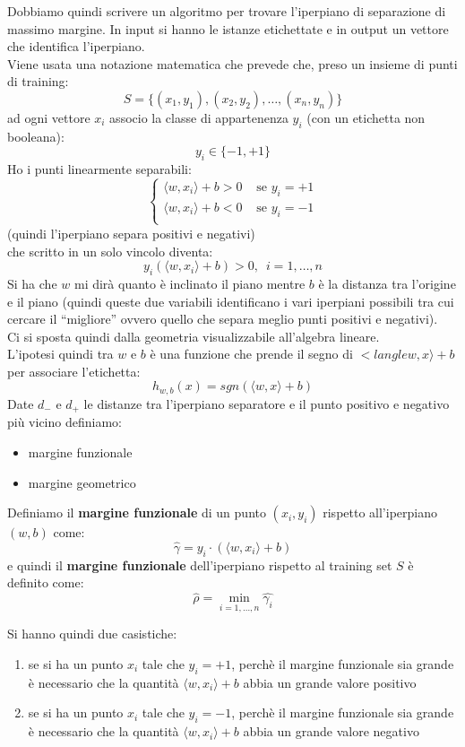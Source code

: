 \documentclass[a4paper,12pt, oneside]{book}
\begin{document}
Dobbiamo quindi scrivere un algoritmo per trovare l'iperpiano di separazione di
massimo margine. In input si hanno le istanze etichettate e in output un
vettore che identifica l'iperpiano.\\
Viene usata una notazione matematica che prevede che, preso un insieme di punti
di training:
\[S = \{(x_1,y_1), (x_2,y_2),\ldots, (x_n,y_n)\}\]
ad ogni vettore $x_i$ associo la classe di appartenenza $y_i$ (con un etichetta
non booleana):
\[y_i\in\{-1,+1\}\]
Ho i punti linearmente separabili:
\[
  \begin{cases}
    \langle w,x_i\rangle + b >0 &\mbox{ se }y_i=+1\\
    \langle w,x_i\rangle + b <0 &\mbox{ se }y_i=-1\\
  \end{cases}
\](quindi l'iperpiano separa positivi e negativi)\\
che scritto in un solo vincolo diventa:
\[y_i(\langle w,x_i\rangle + b )>0,\,\,\,i=1,\ldots, n\]
Si ha che $w$ mi dirà quanto è inclinato il piano mentre $b$ è la distanza tra
l'origine e il piano (quindi queste due variabili identificano i vari iperpiani
possibili tra cui cercare il ``migliore'' ovvero quello che separa meglio punti
positivi e negativi).\\
Ci si sposta quindi dalla geometria visualizzabile all'algebra lineare.\\
L'ipotesi quindi tra $w$ e $b$ è una funzione che prende il segno di $<langle
w,x\rangle+b$ per associare l'etichetta:
\[h_{w,b}(x)=sgn(\langle w,x\rangle+b)\]
Date $d_-$ e $d_+$ le distanze tra l’iperpiano separatore e il punto positivo e
negativo più vicino definiamo:
\begin{itemize}
  \item margine funzionale
  \item margine geometrico
\end{itemize}
\begin{definizione}
  Definiamo il \textbf{margine funzionale} di un punto $(x_i,y_i)$ rispetto
  all'iperpiano $(w,b)$ come:
  \[\hat{\gamma}=y_i\cdot(\langle w,x_i\rangle+b)\]
  e quindi il \textbf{margine funzionale} dell'iperpiano rispetto al training
  set $S$ è definito come:
  \[\hat{\rho}=\min_{i=1,\ldots,n}\hat{\gamma_i}\]
\end{definizione}
Si hanno quindi due casistiche:
\begin{enumerate}
  \item se si ha un punto $x_i$ tale che $y_i=+1$, perchè il margine funzionale
  sia grande è necessario che la quantità
  $\langle w,x_i\rangle+b$ abbia un grande valore positivo
   \item se si ha un punto $x_i$ tale che $y_i=-1$, perchè il margine funzionale
  sia grande è necessario che  la quantità
  $\langle w,x_i\rangle+b$ abbia un grande valore negativo
\end{enumerate}
\end{document}
